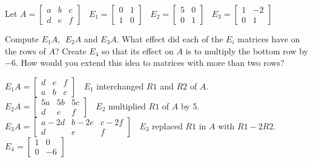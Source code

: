 \documentclass{ximera}
\begin{document}
\begin{problem}
Let $A = \left[ \begin{array}{rrr} a & b & c \\ d & e & f \end{array} \right] \;\;\; E_1 = \left[ \begin{array}{rr} 0 & 1 \\ 1 & 0 \end{array} \right] \;\;\; E_2 = \left[ \begin{array}{rr} 5 & 0 \\ 0 & 1 \end{array} \right] \;\;\; E_3 = \left[ \begin{array}{rr} 1 & -2 \\ 0 & 1 \end{array} \right]$ 

Compute $E_1A$, $\; E_2A$ and $E_3A$.  What effect did each of the $E_{i}$ matrices have on the rows of $A$?  Create $E_4$ so that its effect on $A$ is to multiply the bottom row by $-6$.  How would you extend this idea to matrices with more than two rows?

\begin{solution}
$E_1A = \left[ \begin{array}{rrr} d & e & f \\ a & b & c\end{array} \right]\;\;$ $E_1$ interchanged $R1$ and $R2$ of $A$.\\
$E_2A = \left[ \begin{array}{rrr} 5a & 5b & 5c \\ d & e & f \end{array} \right]\;\;$ $E_2$ multiplied $R1$ of $A$ by 5.\\
$E_3A = \left[ \begin{array}{rrr} a - 2d & b - 2e & c - 2f \\ d & e & f \end{array} \right]\;\;$ $E_3$ replaced $R1$ in $A$ with $R1 - 2R2$.\\
$E_4 = \left[ \begin{array}{rr} 1 & 0 \\ 0 & -6 \end{array} \right]\;\;$
\end{solution}
\end{problem}
\end{document}
